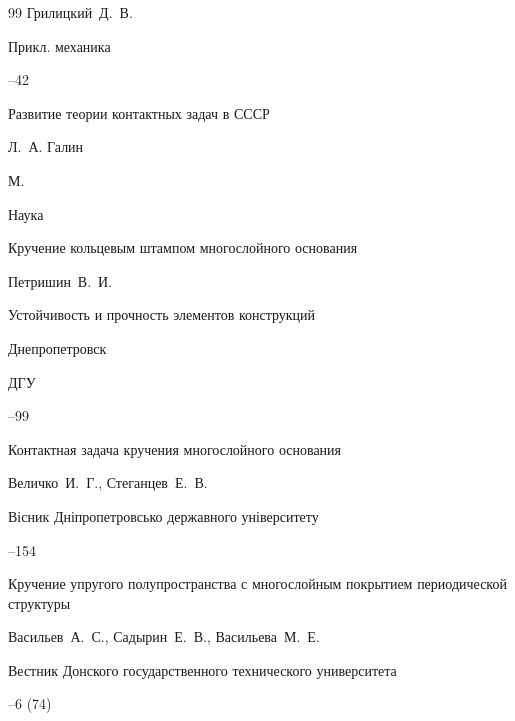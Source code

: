 \begin{thebibliography}{99}
\by Грилицкий~Д.~В. 

\jour Прикл. механика




--42




\book  Развитие теории контактных задач в СССР

\eds Л.~А. Галин

\publaddr М.

\publ Наука








\paper Кручение кольцевым штампом многослойного основания

\by Петришин~В.~И.

\inbook Устойчивость и прочность элементов конструкций 

\publaddr Днепропетровск

\publ ДГУ


--99




\paper Контактная задача кручения многослойного основания

\by Величко~И.~Г., Стеганцев~Е.~В.

\jour Вісник Дніпропетровсько державного університету



--154






\paper Кручение упругого полупространства с многослойным покрытием периодической структуры

\by Васильев~А.~С., Садырин~Е.~В., Васильева~М.~Е. 

\jour Вестник Донского государственного технического университета 



--6 (74) 


\end{thebibliography}
